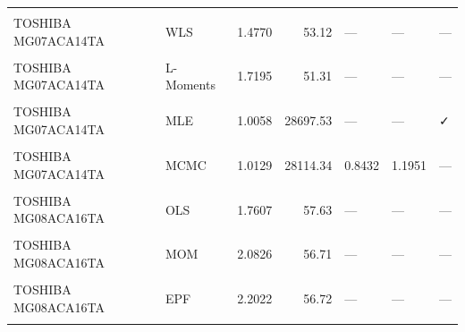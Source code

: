 \documentclass[
]{article}
\begin{document}
\begin{longtable}[t]{llrrlll}
\endfoot
\bottomrule
\endlastfoot
\cellcolor{gray!10}{TOSHIBA MG07ACA14TA} & \cellcolor{gray!10}{OLS} & \cellcolor{gray!10}{1.2386} & \cellcolor{gray!10}{53.85} & \cellcolor{gray!10}{—} & \cellcolor{gray!10}{—} & \cellcolor{gray!10}{—}\\
TOSHIBA MG07ACA14TA & WLS & 1.4770 & 53.12 & — & — & —\\
\cellcolor{gray!10}{TOSHIBA MG07ACA14TA} & \cellcolor{gray!10}{MOM} & \cellcolor{gray!10}{1.7994} & \cellcolor{gray!10}{51.44} & \cellcolor{gray!10}{—} & \cellcolor{gray!10}{—} & \cellcolor{gray!10}{—}\\
TOSHIBA MG07ACA14TA & L-Moments & 1.7195 & 51.31 & — & — & —\\
\cellcolor{gray!10}{TOSHIBA MG07ACA14TA} & \cellcolor{gray!10}{EPF} & \cellcolor{gray!10}{1.9214} & \cellcolor{gray!10}{51.57} & \cellcolor{gray!10}{—} & \cellcolor{gray!10}{—} & \cellcolor{gray!10}{—}\\
\addlinespace
TOSHIBA MG07ACA14TA & MLE & 1.0058 & 28697.53 & — & — & ✓\\
\cellcolor{gray!10}{TOSHIBA MG07ACA14TA} & \cellcolor{gray!10}{MAP} & \cellcolor{gray!10}{1.9308} & \cellcolor{gray!10}{1692.28} & \cellcolor{gray!10}{—} & \cellcolor{gray!10}{—} & \cellcolor{gray!10}{✓}\\
TOSHIBA MG07ACA14TA & MCMC & 1.0129 & 28114.34 & 0.8432 & 1.1951 & —\\
\cellcolor{gray!10}{TOSHIBA MG07ACA14TA} & \cellcolor{gray!10}{Percentile} & \cellcolor{gray!10}{1.6657} & \cellcolor{gray!10}{54.22} & \cellcolor{gray!10}{—} & \cellcolor{gray!10}{—} & \cellcolor{gray!10}{—}\\
TOSHIBA MG08ACA16TA & OLS & 1.7607 & 57.63 & — & — & —\\
\addlinespace
\cellcolor{gray!10}{TOSHIBA MG08ACA16TA} & \cellcolor{gray!10}{WLS} & \cellcolor{gray!10}{1.8102} & \cellcolor{gray!10}{58.40} & \cellcolor{gray!10}{—} & \cellcolor{gray!10}{—} & \cellcolor{gray!10}{—}\\
TOSHIBA MG08ACA16TA & MOM & 2.0826 & 56.71 & — & — & —\\
\cellcolor{gray!10}{TOSHIBA MG08ACA16TA} & \cellcolor{gray!10}{L-Moments} & \cellcolor{gray!10}{2.0135} & \cellcolor{gray!10}{56.69} & \cellcolor{gray!10}{—} & \cellcolor{gray!10}{—} & \cellcolor{gray!10}{—}\\
TOSHIBA MG08ACA16TA & EPF & 2.2022 & 56.72 & — & — & —\\
\cellcolor{gray!10}{TOSHIBA MG08ACA16TA} & \cellcolor{gray!10}{MLE} & \cellcolor{gray!10}{1.2674} & \cellcolor{gray!10}{11837.55} & \cellcolor{gray!10}{—} & \cellcolor{gray!10}{—} & \cellcolor{gray!10}{✓}\\

\end{longtable}
\end{document}
